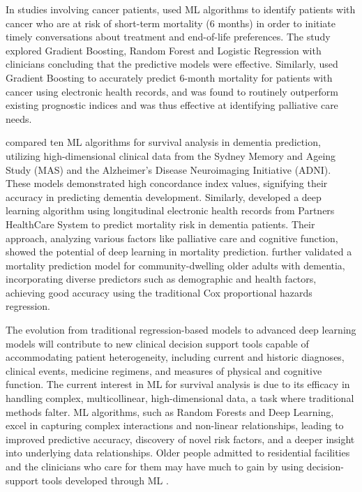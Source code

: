 \documentclass{article}
\begin{document}
In studies involving cancer patients,  \citet{parikh2019predict} used ML algorithms to identify patients with cancer who are at risk of short-term mortality (6 months) in order to initiate timely conversations about treatment and end-of-life preferences. The study explored Gradient Boosting, Random Forest and Logistic Regression with clinicians concluding that the predictive models were effective. Similarly, \citet{manz2020ml} used Gradient Boosting to accurately predict 6-month mortality for patients with cancer using electronic health records, and was found to routinely outperform existing prognostic indices and was thus effective at identifying palliative care needs.

\citet{spooner2020comparison} compared ten ML algorithms for survival analysis in dementia prediction, utilizing high-dimensional clinical data from the Sydney Memory and Ageing Study (MAS) and the Alzheimer's Disease Neuroimaging Initiative (ADNI). These models demonstrated high concordance index values, signifying their accuracy in predicting dementia development. Similarly, \citet{wang2019development} developed a deep learning algorithm using longitudinal electronic health records from Partners HealthCare System to predict mortality risk in dementia patients. Their approach, analyzing various factors like palliative care and cognitive function, showed the potential of deep learning in mortality prediction. \citet{deardorff2022development} further validated a mortality prediction model for community-dwelling older adults with dementia, incorporating diverse predictors such as demographic and health factors, achieving good accuracy using the traditional Cox proportional hazards regression.

 The evolution from traditional regression-based models to advanced deep learning models will contribute to new clinical decision support tools capable of accommodating patient heterogeneity, including current and historic diagnoses, clinical events, medicine regimens, and measures of physical and cognitive function.  The current interest in ML for survival analysis is due to its efficacy in handling complex, multicollinear, high-dimensional data, a task where traditional methods falter.  ML algorithms, such as Random Forests and Deep Learning, excel in capturing complex interactions and non-linear relationships, leading to improved predictive accuracy, discovery of novel risk factors, and a deeper insight into underlying data relationships\cite{parikh2019predict,tran2022helicobacter,spooner2020comparison,wang2019development}.  Older people admitted to residential facilities and the clinicians who care for them may have much to gain by using decision-support tools developed through ML   \cite{woodman2023comprehensive}.
\end{document}
